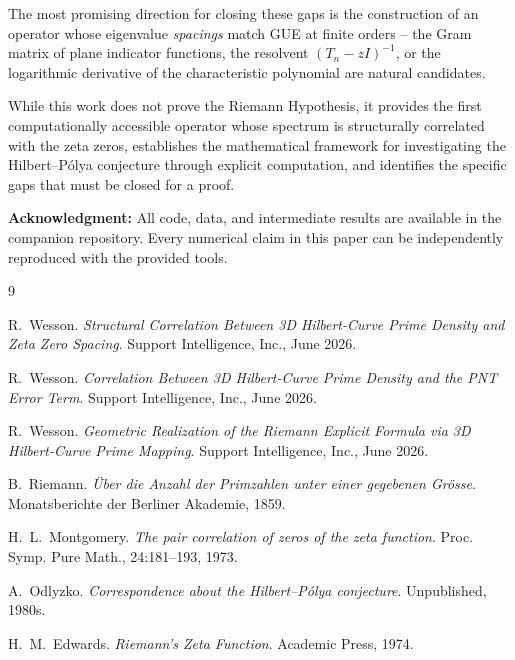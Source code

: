 \documentclass[11pt,a4paper]{article}
\begin{document}
The most promising direction for closing these gaps is the construction
of an operator whose eigenvalue \emph{spacings} match GUE at finite
orders -- the Gram matrix of plane indicator functions, the resolvent
$(T_n - zI)^{-1}$, or the logarithmic derivative of the characteristic
polynomial are natural candidates.

While this work does not prove the Riemann Hypothesis, it provides the
first computationally accessible operator whose spectrum is
structurally correlated with the zeta zeros, establishes the
mathematical framework for investigating the Hilbert--P\'{o}lya
conjecture through explicit computation, and identifies the specific
gaps that must be closed for a proof.

\textbf{Acknowledgment:} All code, data, and intermediate results are
available in the companion repository.  Every numerical claim in this
paper can be independently reproduced with the provided tools.

\begin{thebibliography}{9}

R.~Wesson.
\emph{Structural Correlation Between 3D Hilbert-Curve Prime Density and
Zeta Zero Spacing}.
Support Intelligence, Inc., June 2026.

R.~Wesson.
\emph{Correlation Between 3D Hilbert-Curve Prime Density and the PNT
Error Term}.
Support Intelligence, Inc., June 2026.

R.~Wesson.
\emph{Geometric Realization of the Riemann Explicit Formula via 3D
Hilbert-Curve Prime Mapping}.
Support Intelligence, Inc., June 2026.

B.~Riemann.
\emph{\"Uber die Anzahl der Primzahlen unter einer gegebenen Gr\"osse}.
Monatsberichte der Berliner Akademie, 1859.

H.~L.~Montgomery.
\emph{The pair correlation of zeros of the zeta function}.
Proc. Symp. Pure Math., 24:181--193, 1973.

A.~Odlyzko.
\emph{Correspondence about the Hilbert--P\'{o}lya conjecture}.
Unpublished, 1980s.

H.~M.~Edwards.
\emph{Riemann's Zeta Function}.
Academic Press, 1974.

\end{thebibliography}
\end{document}

